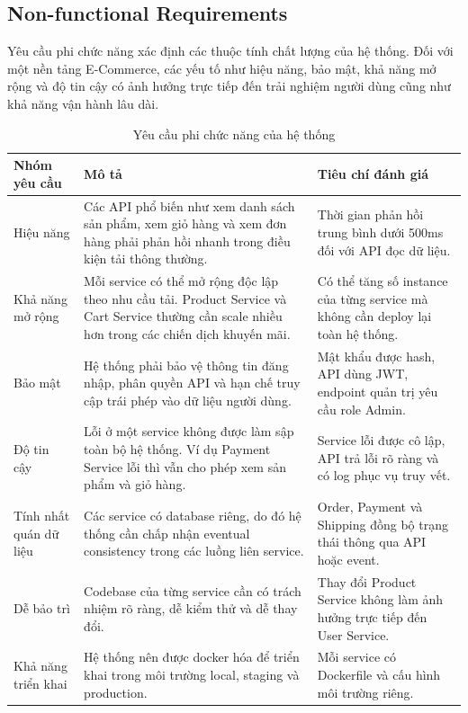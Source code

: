 \documentclass[../main.tex]{subfiles}
\begin{document}
\subsection{Non-functional Requirements}
\label{subsection:2.1.2}

Yêu cầu phi chức năng xác định các thuộc tính chất lượng của hệ thống. Đối với một nền tảng E-Commerce, các yếu tố như hiệu năng, bảo mật, khả năng mở rộng và độ tin cậy có ảnh hưởng trực tiếp đến trải nghiệm người dùng cũng như khả năng vận hành lâu dài.

\begin{table}[H]
    \centering
    \caption{Yêu cầu phi chức năng của hệ thống}
    \label{tab:chapter2-non-functional-requirements}
    \begin{tabular}{|p{}|p{}|p{}|}
        \hline
        \rowcolor{primary!35}
        \textbf{Nhóm yêu cầu} & \textbf{Mô tả} & \textbf{Tiêu chí đánh giá} \\
        \hline
        Hiệu năng & Các API phổ biến như xem danh sách sản phẩm, xem giỏ hàng và xem đơn hàng phải phản hồi nhanh trong điều kiện tải thông thường. & Thời gian phản hồi trung bình dưới 500ms đối với API đọc dữ liệu. \\
        \hline
        Khả năng mở rộng & Mỗi service có thể mở rộng độc lập theo nhu cầu tải. Product Service và Cart Service thường cần scale nhiều hơn trong các chiến dịch khuyến mãi. & Có thể tăng số instance của từng service mà không cần deploy lại toàn hệ thống. \\
        \hline
        Bảo mật & Hệ thống phải bảo vệ thông tin đăng nhập, phân quyền API và hạn chế truy cập trái phép vào dữ liệu người dùng. & Mật khẩu được hash, API dùng JWT, endpoint quản trị yêu cầu role Admin. \\
        \hline
        Độ tin cậy & Lỗi ở một service không được làm sập toàn bộ hệ thống. Ví dụ Payment Service lỗi thì vẫn cho phép xem sản phẩm và giỏ hàng. & Service lỗi được cô lập, API trả lỗi rõ ràng và có log phục vụ truy vết. \\
        \hline
        Tính nhất quán dữ liệu & Các service có database riêng, do đó hệ thống cần chấp nhận eventual consistency trong các luồng liên service. & Order, Payment và Shipping đồng bộ trạng thái thông qua API hoặc event. \\
        \hline
        Dễ bảo trì & Codebase của từng service cần có trách nhiệm rõ ràng, dễ kiểm thử và dễ thay đổi. & Thay đổi Product Service không làm ảnh hưởng trực tiếp đến User Service. \\
        \hline
        Khả năng triển khai & Hệ thống nên được docker hóa để triển khai trong môi trường local, staging và production. & Mỗi service có Dockerfile và cấu hình môi trường riêng. \\
        \hline
    \end{tabular}
\end{table}
\end{document}
